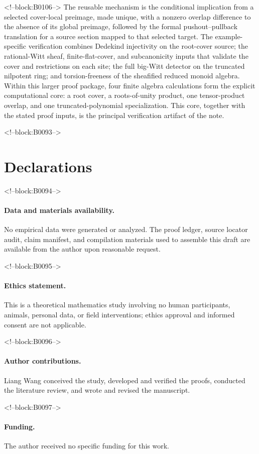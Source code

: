 \documentclass[11pt]{article}
\theoremstyle{definition}
\begin{document}
<!--block:B0106-->
The reusable mechanism is the conditional implication from a selected
cover-local preimage, made unique, with a nonzero overlap difference to
the absence of its global preimage, followed by the formal
pushout--pullback translation for a source section mapped to that selected
target.  The example-specific verification combines Dedekind injectivity on the
root-cover source; the rational-Witt sheaf, finite-flat-cover, and
subcanonicity inputs that validate the cover and restrictions on each site;
the full big-Witt detector on the truncated nilpotent ring; and
torsion-freeness of the sheafified reduced monoid algebra.  Within this larger proof package,
four finite algebra calculations form the explicit computational core: a
root cover, a roots-of-unity product, one tensor-product overlap, and one
truncated-polynomial specialization.  This core, together with the stated
proof inputs, is the principal verification artifact of the note.

<!--block:B0093-->
\section*{Declarations}

<!--block:B0094-->
\paragraph{Data and materials availability.}
No empirical data were generated or analyzed.  The proof ledger, source
locator audit, claim manifest, and compilation materials used to assemble
this draft are available from the author upon reasonable request.

<!--block:B0095-->
\paragraph{Ethics statement.}
This is a theoretical mathematics study involving no human participants,
animals, personal data, or field interventions; ethics approval and
informed consent are not applicable.

<!--block:B0096-->
\paragraph{Author contributions.}
Liang Wang conceived the study, developed and verified the proofs, conducted the literature review, and wrote and revised the manuscript.

<!--block:B0097-->
\paragraph{Funding.}
The author received no specific funding for this work.
\end{document}
